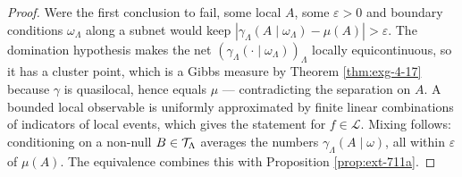 \begin{proof}
    \leanok

    Were the first conclusion to fail, some local $A$, some $\varepsilon > 0$ and boundary
    conditions $\omega_\Lambda$ along a subnet would keep
    $|\gamma_\Lambda(A \mid \omega_\Lambda) - \mu(A)| > \varepsilon$. The domination hypothesis
    makes the net $(\gamma_\Lambda(\cdot \mid \omega_\Lambda))_\Lambda$ locally equicontinuous, so
    it has a cluster point, which is a Gibbs measure by Theorem \ref{thm:exg-4-17} because
    $\gamma$ is quasilocal, hence equals $\mu$ --- contradicting the separation on $A$. A bounded
    local observable is uniformly approximated by finite linear combinations of indicators of
    local events, which gives the statement for $f \in \mathcal L$. Mixing follows: conditioning
    on a non-null $B \in \mathcal{T}_\Lambda$ averages the numbers $\gamma_\Lambda(A \mid \omega)$, all
    within $\varepsilon$ of $\mu(A)$. The equivalence combines this with Proposition
    \ref{prop:ext-711a}.
\end{proof}
